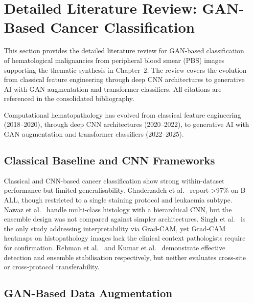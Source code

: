 
\section{Detailed Literature Review: GAN-Based Cancer Classification}
\label{app:ch2_cancer}
\label{sec:topic3_cancer}

This section provides the detailed literature review for GAN-based classification of hematological malignancies from peripheral blood smear (PBS) images supporting the thematic synthesis in Chapter~2. The review covers the evolution from classical feature engineering through deep CNN architectures to generative AI with GAN augmentation and transformer classifiers. All citations are referenced in the consolidated bibliography.

Computational hematopathology has evolved from classical feature engineering (2018--2020), through deep CNN architectures (2020--2022), to generative AI with GAN augmentation and transformer classifiers (2022--2025).

\subsection{Classical Baseline and CNN Frameworks}

Classical and CNN-based cancer classification show strong within-dataset performance but limited generalisability. Ghaderzadeh et al.~\cite{ghaderzadeh2022ball} report >97\% on B-ALL, though restricted to a single staining protocol and leukaemia subtype. Nawaz et al.~\cite{nawaz2018multiclass} handle multi-class histology with a hierarchical CNN, but the ensemble design was not compared against simpler architectures. Singh et al.~\cite{singh2022gradcam} is the only study addressing interpretability via Grad-CAM, yet Grad-CAM heatmaps on histopathology images lack the clinical context pathologists require for confirmation. Rehman et al.~\cite{rehman2019all} and Kumar et al.~\cite{kumar2023ensemble} demonstrate effective detection and ensemble stabilisation respectively, but neither evaluates cross-site or cross-protocol transferability.

\subsection{GAN-Based Data Augmentation}

